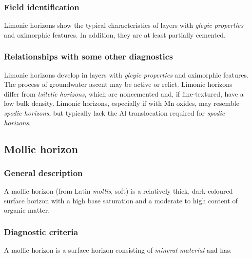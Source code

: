 \documentclass[
  letterpaper,
  DIV=11,
  numbers=noendperiod]{scrreprt}
\begin{document}
\hypertarget{field-identification-13}{%
\subsubsection{Field identification}\label{field-identification-13}}

Limonic horizons show the typical characteristics of layers with
\emph{gleyic properties} and oximorphic features. In addition, they are
at least partially cemented.

\hypertarget{relationships-with-some-other-diagnostics-18}{%
\subsubsection{Relationships with some other
diagnostics}\label{relationships-with-some-other-diagnostics-18}}

Limonic horizons develop in layers with \emph{gleyic properties} and
oximorphic features. The process of groundwater ascent may be active or
relict. Limonic horizons differ from \emph{tsitelic horizons}, which are
noncemented and, if fine-textured, have a low bulk density. Limonic
horizons, especially if with Mn oxides, may resemble \emph{spodic
horizons}, but typically lack the Al translocation required for
\emph{spodic horizons}.

\hypertarget{mollic-horizon}{%
\subsection{Mollic horizon}\label{mollic-horizon}}

\hypertarget{general-description-19}{%
\subsubsection{General description}\label{general-description-19}}

A mollic horizon (from Latin \emph{mollis}, soft) is a relatively thick,
dark-coloured surface horizon with a high base saturation and a moderate
to high content of organic matter.

\hypertarget{diagnostic-criteria-19}{%
\subsubsection{Diagnostic criteria}\label{diagnostic-criteria-19}}

A mollic horizon is a surface horizon consisting of \emph{mineral
material} and has:
\end{document}
